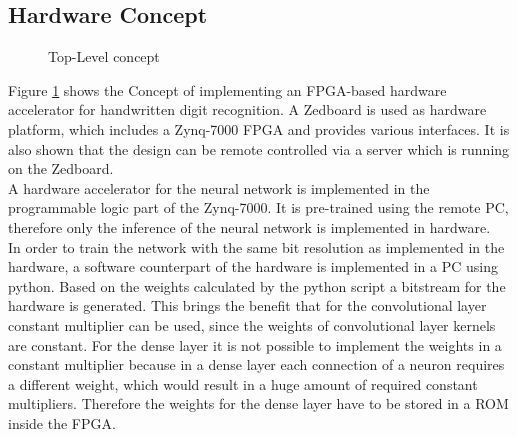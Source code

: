 \subsection{Hardware Concept}
\begin{figure}[h]
	\centering
	
	\caption[Top-Level concept.]{Top-Level concept}
	\label{FIG:concept}
\end{figure}
\noindent
Figure \ref{FIG:concept} shows the Concept of implementing an FPGA-based hardware accelerator for handwritten digit recognition. A Zedboard is used as hardware platform, which includes a Zynq-7000 FPGA and provides various interfaces. It is also shown that the design can be remote controlled via a server which is running on the Zedboard. \\
A hardware accelerator for the neural network is implemented in the programmable logic part of the Zynq-7000. It is pre-trained using the remote PC, therefore only the inference of the neural network is implemented in hardware. \\
In order to train the network with the same bit resolution as implemented in the hardware, a software counterpart of the hardware is implemented in a PC using python. 
Based on the weights calculated by the python script a bitstream for the hardware is generated. This brings the benefit that for the convolutional layer constant multiplier can be used, since the weights of convolutional layer kernels are constant. For the dense layer it is not possible to implement the weights in a constant multiplier because in a dense layer each connection of a neuron requires a different weight, which would result in a huge amount of required constant multipliers. Therefore the weights for the dense layer have to be stored in a ROM inside the FPGA.   \\


